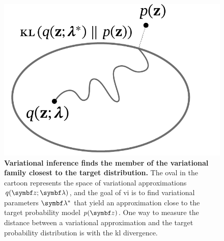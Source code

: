 \begin{figure}[t]
  \centering
  \includegraphics[height=0.2\paperheight]{fig/vi-cartoon.pdf}
  \caption[Variational inference cartoon]{
  \textbf{Variational inference finds the member of the variational family closest to the target distribution.} The oval in the cartoon represents the space of variational approximations $q(\mbz; \mblambda)$, and the goal of \acrlong{vi} is to find variational parameters $\mblambda^*$ that yield an approximation close to the target probability model $p(\mbz)$. One way to measure the distance between a variational approximation and the target probability distribution is with the \gls{kl} divergence.}
  \label{fig:vi-cartoon}
\end{figure}